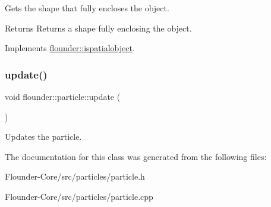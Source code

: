 Gets the shape that fully encloses the object. 

\begin{DoxyReturn}{Returns}
Returns a shape fully enclosing the object. 
\end{DoxyReturn}


Implements \hyperlink{classflounder_1_1ispatialobject_af3867cbb5f35b0296a16af77703e6c81}{flounder\+::ispatialobject}.

\mbox{\label{classflounder_1_1particle_ad524600c5aa2c2594896cf8702187e7e}} 
\subsubsection{\texorpdfstring{update()}{update()}}
{\footnotesize\ttfamily void flounder\+::particle\+::update (\begin{DoxyParamCaption}{ }\end{DoxyParamCaption})}



Updates the particle. 



The documentation for this class was generated from the following files\+:\begin{DoxyCompactItemize}
\item 
Flounder-\/\+Core/src/particles/particle.\+h\item 
Flounder-\/\+Core/src/particles/particle.\+cpp\end{DoxyCompactItemize}
